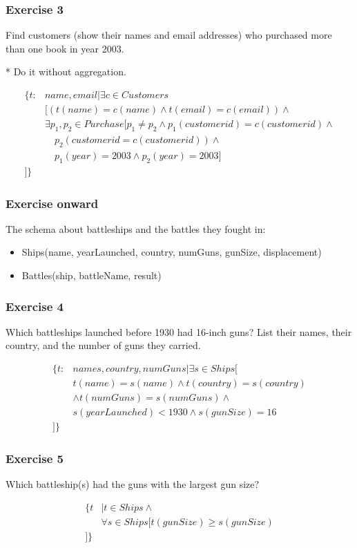 \documentclass{beamer}
\begin{document}
\begin{frame}[fragile]
\frametitle{Exercise 3}
Find customers (show their names and email addresses) who purchased more than one book in year 2003.

* Do it without aggregation. 

\begin{align*}
\{t: &name, email| \exists c \in Customers \\
&[(t(name)=c(name)\wedge t(email)=c(email)) \wedge \\
& \exists p_1,p_2 \in Purchase [p_1\neq p_2 \wedge p_1(customerid)=c(customerid) \wedge \\ 
&\quad p_2(customerid=c(customerid)) \wedge \\
&\quad p_1(year)=2003 \wedge p_2(year)=2003]\\
]\}
\end{align*}
\end{frame}


\begin{frame}[fragile]
\frametitle{Exercise onward}
The schema about battleships and the battles they fought in:
\begin{itemize}
\item Ships(name, yearLaunched, country, numGuns, gunSize, displacement)
\item Battles(ship, battleName, result)
\end{itemize}
\end{frame}

\begin{frame}[fragile]
\frametitle{Exercise 4}
Which battleships launched before 1930 had 16-inch guns? List their names, their country, and the number of guns they carried.

\begin{align*}
\{t:& names, country, numGuns|\exists s\in Ships[ \\
& t(name)=s(name) \wedge t(country)=s(country) \\ 
& \wedge  t(numGuns)=s(numGuns)\wedge \\
&s(yearLaunched)<1930 \wedge s(gunSize)=16\\
]\}
\end{align*}
\end{frame}


\begin{frame}[fragile]
\frametitle{Exercise 5}
Which battleship(s) had the guns with the largest gun size?

\begin{align*}
\{t&| t\in Ships \wedge \\ 
&\forall s\in Ships [t(gunSize)\geq s(gunSize)\\
]\}
\end{align*}
\end{frame}
\end{document}

